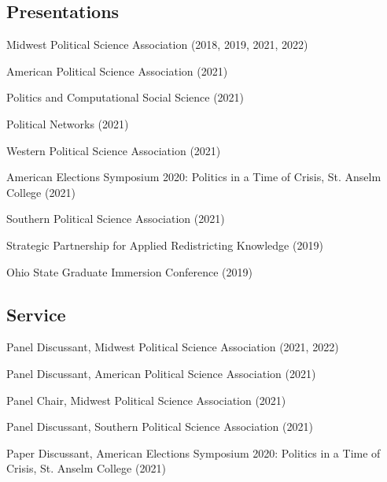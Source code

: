 \documentclass[letterpaper]{article}
\renewenvironment{itemize}{
  \begin{list}{}{
    \setlength{\leftmargin}{1.5em}
  }
}{
  \end{list}
}
\begin{document}
\subsection*{Presentations}
\begin{itemize}

\item Midwest Political Science Association (2018, 2019, 2021, 2022)

\item American Political Science Association (2021)

\item Politics and Computational Social Science (2021)

\item Political Networks (2021)

\item Western Political Science Association (2021)

\item American Elections Symposium 2020: Politics in a Time of Crisis, St. Anselm College (2021)

\item Southern Political Science Association (2021)

\item Strategic Partnership for Applied Redistricting Knowledge (2019)

\item Ohio State Graduate Immersion Conference (2019)
\end{itemize}

\subsection*{Service}
\begin{itemize}

\item Panel Discussant, Midwest Political Science Association (2021, 2022)

\item Panel Discussant, American Political Science Association (2021)

\item Panel Chair, Midwest Political Science Association (2021)

\item Panel Discussant, Southern Political Science Association (2021)

\item Paper Discussant, American Elections Symposium 2020: Politics in a Time of Crisis, St. Anselm College (2021)

\end{itemize}
\end{document}
